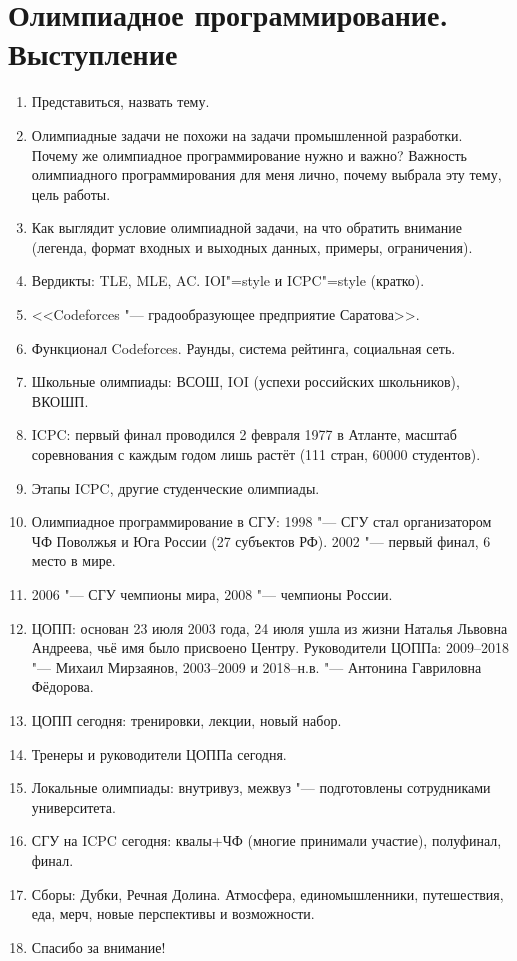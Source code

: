 \documentclass[10pt]{article}
\begin{document}
\section*{Олимпиадное программирование. Выступление}
\begin{enumerate}
\item Представиться, назвать тему.
\item Олимпиадные задачи не похожи на задачи промышленной разработки. Почему же олимпиадное программирование нужно и важно? Важность олимпиадного программирования для меня лично, почему выбрала эту тему, цель работы.
\item Как выглядит условие олимпиадной задачи, на что обратить внимание (легенда, формат входных и выходных данных, примеры, ограничения).
\item Вердикты: TLE, MLE, AC. IOI"=style и ICPC"=style (кратко).
\item <<Codeforces "--- градообразующее предприятие Саратова>>.
\item Функционал Codeforces. Раунды, система рейтинга, социальная сеть.
\item Школьные олимпиады: ВСОШ, IOI (успехи российских школьников), ВКОШП.
\item ICPC: первый финал проводился 2 февраля 1977 в Атланте, масштаб соревнования с каждым годом лишь растёт (111 стран, 60000 студентов).
\item Этапы ICPC, другие студенческие олимпиады.
\item Олимпиадное программирование в СГУ: 1998 "--- СГУ стал организатором ЧФ Поволжья и Юга России (27 субъектов РФ). 2002 "--- первый финал, 6 место в мире.
\item 2006 "--- СГУ чемпионы мира, 2008 "--- чемпионы России.
\item ЦОПП: основан 23 июля 2003 года, 24 июля ушла из жизни Наталья Львовна Андреева, чьё имя было присвоено Центру. Руководители ЦОППа: 2009--2018 "--- Михаил Мирзаянов, 2003--2009 и 2018--н.в. "--- Антонина Гавриловна Фёдорова.
\item ЦОПП сегодня: тренировки, лекции, новый набор.
\item Тренеры и руководители ЦОППа сегодня.
\item Локальные олимпиады: внутривуз, межвуз "--- подготовлены сотрудниками университета.
\item СГУ на ICPC сегодня: квалы+ЧФ (многие принимали участие), полуфинал, финал.
\item Сборы: Дубки, Речная Долина. Атмосфера, единомышленники, путешествия, еда, мерч, новые перспективы и возможности.
\item Спасибо за внимание!
\end{enumerate}
\end{document}
